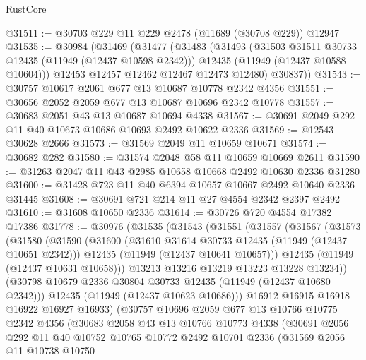 \begin{lexlean}{RustCore}
\begin{coremodule}
@31511 := @30703 @229 @11 @229 @2478 (@11689 (@30708 @229)) @12947
@31535 := @30984
    (@31469
      (@31477
        (@31483
          (@31493
            (@31503 @31511 @30733 @12435 (@11949 (@12437 @10598 @2342)))
            @12435
            (@11949 (@12437 @10588 @10604)))
          @12453
          @12457
          @12462
          @12467
          @12473
          @12480)
        @30837))
@31543 := @30757 @10617 @2061 @677 @13 @10687 @10778 @2342 @4356
@31551 := @30656 @2052 @2059 @677 @13 @10687 @10696 @2342 @10778
@31557 := @30683 @2051 @43 @13 @10687 @10694 @4338
@31567 := @30691 @2049 @292 @11 @40 @10673 @10686 @10693 @2492 @10622 @2336
@31569 := @12543 @30628 @2666
@31573 := @31569 @2049 @11 @10659 @10671
@31574 := @30682 @282
@31580 := @31574 @2048 @58 @11 @10659 @10669 @2611
@31590 := @31263 @2047 @11 @43 @2985 @10658 @10668 @2492 @10630 @2336 @31280
@31600 := @31428 @723 @11 @40 @6394 @10657 @10667 @2492 @10640 @2336 @31445
@31608 := @30691 @721 @214 @11 @27 @4554 @2342 @2397 @2492
@31610 := @31608 @10650 @2336
@31614 := @30726 @720 @4554 @17382 @17386
@31778 := @30976
    (@31535
      (@31543
        (@31551
          (@31557
            (@31567
              (@31573
                (@31580
                  (@31590
                    (@31600
                      (@31610 @31614 @30733 @12435 (@11949 (@12437 @10651 @2342)))
                      @12435
                      (@11949 (@12437 @10641 @10657)))
                    @12435
                    (@11949 (@12437 @10631 @10658)))
                  @13213
                  @13216
                  @13219
                  @13223
                  @13228
                  @13234))
              (@30798 @10679 @2336 @30804 @30733 @12435 (@11949 (@12437 @10680 @2342)))
              @12435
              (@11949 (@12437 @10623 @10686)))
            @16912
            @16915
            @16918
            @16922
            @16927
            @16933)
          (@30757
            @10696
            @2059
            @677
            @13
            @10766
            @10775
            @2342
            @4356
            (@30683
              @2058
              @43
              @13
              @10766
              @10773
              @4338
              (@30691
                @2056
                @292
                @11
                @40
                @10752
                @10765
                @10772
                @2492
                @10701
                @2336
                (@31569
                  @2056
                  @11
                  @10738
                  @10750

\end{coremodule}
\end{lexlean}
